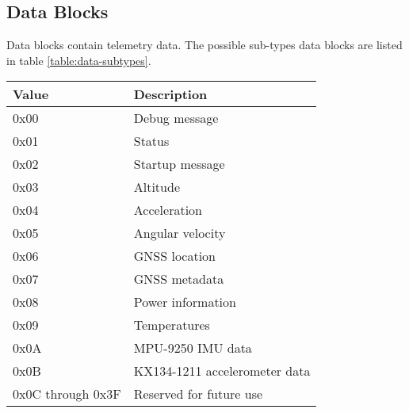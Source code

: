 \subsection{Data Blocks}

Data blocks contain telemetry data. The possible sub-types data blocks are listed in table \ref{table:data-subtypes}.

\begin{table*}[htb]
    \centering
    \begin{tabular}{@{}ll@{}}
        \toprule
        Value             & Description                   \\
        \midrule
        0x00              & Debug message                 \\
        0x01              & Status                        \\
        0x02              & Startup message               \\
        0x03              & Altitude                      \\
        0x04              & Acceleration                  \\
        0x05              & Angular velocity              \\
        0x06              & GNSS location                 \\
        0x07              & GNSS metadata                 \\
        0x08              & Power information             \\
        0x09              & Temperatures                  \\
        0x0A              & MPU-9250 IMU data             \\
        0x0B              & KX134-1211 accelerometer data \\
        0x0C through 0x3F & Reserved for future use       \\
        \bottomrule
    \end{tabular}
    \caption{Data Block Subtypes}
    \label{table:data-subtypes}
\end{table*}











